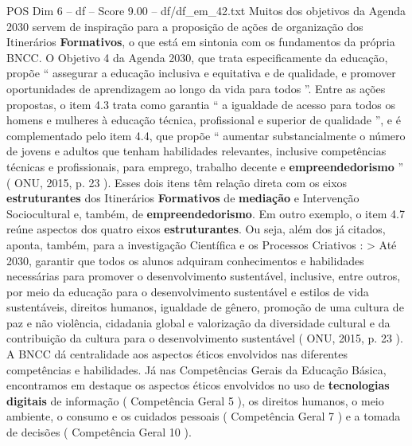 \begin{textsample}{POS Dim 6 – df – Score 9.00 – df/df\_em\_42.txt}
Muitos dos objetivos da Agenda 2030 servem de inspiração para a proposição de ações de organização dos Itinerários \textbf{Formativos}, o que está em sintonia com os fundamentos da própria BNCC.
O Objetivo 4 da Agenda 2030, que trata especificamente da educação, propõe “ assegurar a educação inclusiva e equitativa e de qualidade, e promover oportunidades de aprendizagem ao longo da vida para todos ”.
Entre as ações propostas, o item 4.3 trata como garantia “ a igualdade de acesso para todos os homens e mulheres à educação técnica, profissional e superior de qualidade ”, e é complementado pelo item 4.4, que propõe “ aumentar substancialmente o número de jovens e adultos que tenham habilidades relevantes, inclusive competências técnicas e profissionais, para emprego, trabalho decente e \textbf{empreendedorismo} ” ( ONU, 2015, p. 23 ).
Esses dois itens têm relação direta com os eixos \textbf{estruturantes} dos Itinerários \textbf{Formativos} de \textbf{mediação} e Intervenção Sociocultural e, também, de \textbf{empreendedorismo}.
Em outro exemplo, o item 4.7 reúne aspectos dos quatro eixos \textbf{estruturantes}.
Ou seja, além dos já citados, aponta, também, para a investigação Científica e os Processos Criativos : > Até 2030, garantir que todos os alunos adquiram conhecimentos e habilidades necessárias para promover o desenvolvimento sustentável, inclusive, entre outros, por meio da educação para o desenvolvimento sustentável e estilos de vida sustentáveis, direitos humanos, igualdade de gênero, promoção de uma cultura de paz e não violência, cidadania global e valorização da diversidade cultural e da contribuição da cultura para o desenvolvimento sustentável ( ONU, 2015, p. 23 ).
A BNCC dá centralidade aos aspectos éticos envolvidos nas diferentes competências e habilidades.
Já nas Competências Gerais da Educação Básica, encontramos em destaque os aspectos éticos envolvidos no uso de \textbf{tecnologias} \textbf{digitais} de informação ( Competência Geral 5 ), os direitos humanos, o meio ambiente, o consumo e os cuidados pessoais ( Competência Geral 7 ) e a tomada de decisões ( Competência Geral 10 ).

\end{textsample}

